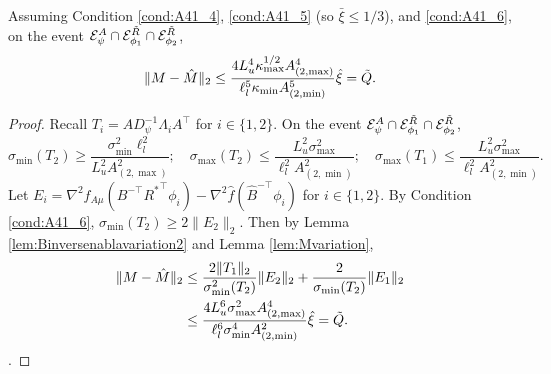 \begin{lemma}
	\label{lem:Tvariantion}
	Assuming Condition \eqref{cond:A41_4}, \eqref{cond:A41_5} (so $\bar{\xi} \le 1/3$), and \eqref{cond:A41_6}, on the event $\mathcal{E}^A_{\psi}\cap\mathcal{E}^{\tilde{R}}_{\phi_1}\cap\mathcal{E}^{\tilde{R}}_{\phi_2}$, 
	\[
	\|M - \hat{M}\|_2 \le  
	\frac{4L_u^4\kappa_{\max}^{1/2}A^4_{(2,\max)}}{\ell_l^5\kappa_{\min} A^5_{(2,\min)}}\hat{\xi}= \tilde{Q}.
	\]
\end{lemma}

\begin{proof}
	Recall $T_i = AD_{\psi}^{-1}\Lambda_iA^{\top}$ for $i \in \{1,2\}$.
	On the event $\mathcal{E}^A_{\psi}\cap\mathcal{E}^{\tilde{R}}_{\phi_1}\cap\mathcal{E}^{\tilde{R}}_{\phi_2}$,
	\[
	\sigma_{\min}(T_2) \ge \frac{\sigma^2_{\min}\ell_l^2}{L^2_uA^2_{(2,\max)}}; \quad \sigma_{\max}(T_2) \le \frac{L_u^2\sigma^2_{\max}}{\ell^2_lA^2_{(2,\min)}};  \quad \sigma_{\max}(T_1) \le \frac{L_u^2\sigma^2_{\max}}{\ell^2_lA^2_{(2,\min)}}. 
	\]
	Let $E_i = \nabla^2 f_{A\mu}(B^{-\top}{R^*}^{\top}\phi_i) - \nabla^2 \hat{f}(\hat{B}^{-\top}\phi_i)$ for  $i\in\{1,2\}$. 
	By Condition \ref{cond:A41_6}, $\sigma_{\min}(T_2) \ge 2\|E_2\|_2$.
	Then by 
	Lemma \ref{lem:Binversenablavariation2} and Lemma \ref{lem:Mvariation},
	\begin{align*}
	\|M - \hat{M}\|_2 & \le
	\frac{2\|T_1\|_2}{\sigma^2_{\min}(T_2)}\|E_2\|_2 + \frac{2}{\sigma_{\min}(T_2)}\|E_1\|_2 \\
	& \le \frac{4L_u^6\sigma^2_{\max}A^4_{(2,\max)}}{\ell_l^6\sigma^4_{\min}A^2_{(2,\min)}}\hat{\xi} = \tilde{Q}.
	\end{align*}.
\end{proof}

